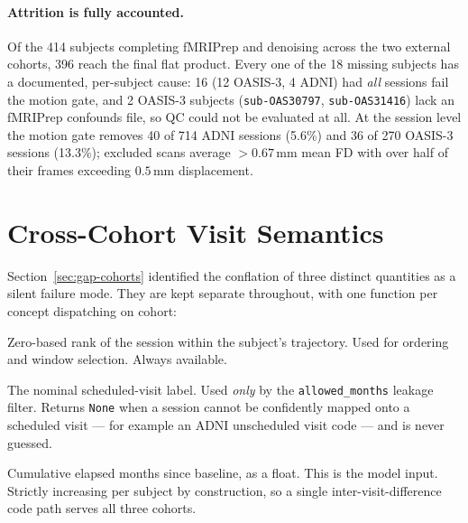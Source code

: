 \paragraph{Attrition is fully accounted.} Of the 414 subjects completing fMRIPrep and
denoising across the two external cohorts, 396 reach the final flat product. Every one of
the 18 missing subjects has a documented, per-subject cause: 16 (12 OASIS-3, 4 ADNI) had
\emph{all} sessions fail the motion gate, and 2 OASIS-3 subjects
(\texttt{sub-OAS30797}, \texttt{sub-OAS31416}) lack an fMRIPrep confounds file, so QC could
not be evaluated at all. At the session level the motion gate removes 40 of 714 ADNI
sessions (5.6\%) and 36 of 270 OASIS-3 sessions (13.3\%); excluded scans average
$>0.67$\,mm mean FD with over half of their frames exceeding $0.5$\,mm displacement.


\section{Cross-Cohort Visit Semantics}
\label{sec:visit-semantics}

Section~\ref{sec:gap-cohorts} identified the conflation of three distinct quantities as a
silent failure mode. They are kept separate throughout, with one function per concept
dispatching on cohort:

\begin{description}[leftmargin=3.2cm,style=nextline]
  \item[\texttt{visit\_index}] Zero-based rank of the session within the subject's
    trajectory. Used for ordering and window selection. Always available.
  \item[\texttt{protocol\_month}] The nominal scheduled-visit label. Used \emph{only} by the
    \texttt{allowed\_months} leakage filter. Returns \texttt{None} when a session cannot be
    confidently mapped onto a scheduled visit --- for example an ADNI unscheduled visit code
    --- and is never guessed.
  \item[\texttt{delta\_t\_months}] Cumulative elapsed months since baseline, as a float.
    This is the model input. Strictly increasing per subject by construction, so a single
    inter-visit-difference code path serves all three cohorts.
\end{description}

